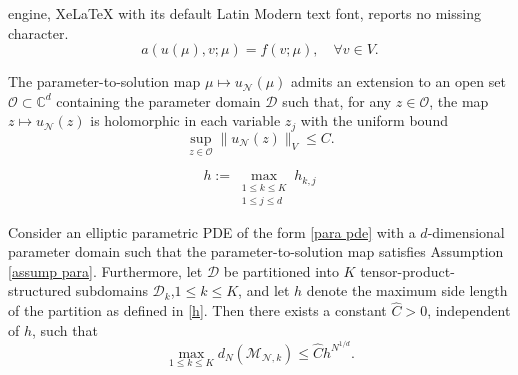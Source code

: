 \documentclass[10pt,a4paper]{amsart}
\begin{document}
engine, XeLaTeX with its default Latin Modern text font, reports no missing character.
\begin{equation}
    a(u(\mu), v ; \mu)=f(v ; \mu), \quad \forall v \in V.
    \label{para pde}
\end{equation}

\begin{assumption}
The parameter-to-solution map $\mu \mapsto u_{\mathcal{N}}(\mu)$ admits an extension to an open set $\mathcal{O} \subset \mathbb{C}^d$ containing the parameter domain $\mathcal{D}$ such that, for any $z \in \mathcal{O}$, the map $z \mapsto u_{\mathcal{N}}(z)$ is holomorphic in each variable $z_j$ with the uniform bound
\begin{equation}
    \sup_{z \in \mathcal{O}} \|u_{\mathcal{N}}(z)\|_V \leq C.
\end{equation}
\label{assump para}
\end{assumption}

\begin{equation}
    h:=\max_{\substack{1 \leq k \leq K \\ 1 \leq j \leq d}}h_{k,j}
    \label{h}
\end{equation}

\begin{proposition} 
    Consider an elliptic parametric PDE of the form \eqref{para pde} with a $d$-dimensional parameter domain such that the parameter-to-solution map satisfies Assumption \ref{assump para}. Furthermore, let $\mathcal{D}$ be partitioned into $K$ tensor-product-structured subdomains ${\mathcal{D}_k}$,$1 \leq k \leq K$, and let $h$ denote the maximum side length of the partition as defined in \eqref{h}. Then there exists a constant $\hat{C} > 0$, independent of $h$, such that
    \begin{equation}
        \max_{1 \leq k \leq K} d_{N}(\mathcal{M}_{\mathcal{N},k}) \leq \hat C h^{N^{1/d}}.
    \label{hat C}
    \end{equation}
\end{proposition}
\end{document}
